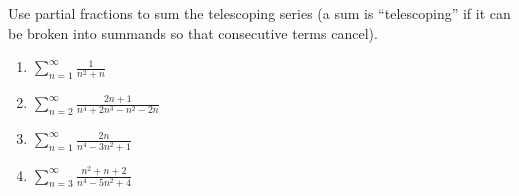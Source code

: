 Use partial fractions to sum the telescoping series (a sum is ``telescoping'' if it can be broken into summands so that consecutive terms cancel).
\begin{multicols}{2}
\begin{enumerate}
\item $\displaystyle \sum\limits_{n=1}^\infty \frac{1}{n^{2}+n}$

\item $\displaystyle \sum\limits_{n=2}^\infty\frac{2 n+1}{n^{4}+2 n^{3}- n^{2}-2 n}$


\item $\displaystyle \sum\limits_{n=1}^\infty \frac{2 n}{n^{4}-3 n^{2}+1}$


\item \label{problemsum_(n=3)^(infty)(n^2+n+2)/(n^4-5n^2+4)} $\displaystyle \sum\limits_{n=3}^\infty \frac{n^{2}+n+2}{ n^{4}- 5  n^{2}+4}$

\end{enumerate}
\end{multicols}